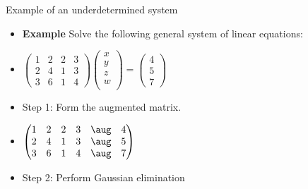 \documentclass{beamer}
\begin{document}
\begin{frame}{Example of an underdetermined system}

\begin{itemize}
\item \textbf{Example} Solve the following general system of linear equations:
\item
$
\begin{pmatrix}
1 & 2 & 2 & 3 \\
2 & 4 & 1 & 3 \\
3 & 6 & 1 & 4
\end{pmatrix}
\begin{pmatrix}
x \\
y \\
z \\
w \\
\end{pmatrix}
=
\begin{pmatrix}
4 \\
5 \\
7
\end{pmatrix}
$
\item Step 1: Form the augmented matrix.
\item
$
\begin{pmatrix}
1 & 2 & 2 & 3  & \aug &  4 \\
2 & 4 & 1 & 3  & \aug &  5 \\
3 & 6 & 1 & 4  & \aug &  7
\end{pmatrix}
$
\item Step 2: Perform Gaussian elimination
\end{itemize}
\end{frame}
\end{document}
